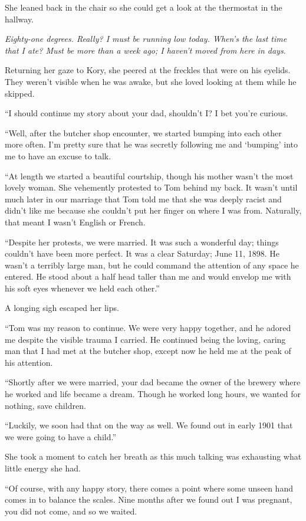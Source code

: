 She leaned back in the chair so she could get a look at the thermostat in the hallway.

\textit{Eighty-one degrees. Really? I must be running low today. When's the last time that I ate? Must be more than a week ago; I haven't moved from here in days.}

Returning her gaze to Kory, she peered at the freckles that were on his eyelids. They weren't visible when he was awake, but she loved looking at them while he skipped.

``I should continue my story about your dad, shouldn't I? I bet you're curious.

``Well, after the butcher shop encounter, we started bumping into each other more often. I'm pretty sure that he was secretly following me and `bumping' into me to have an excuse to talk.

``At length we started a beautiful courtship, though his mother wasn't the most lovely woman. She vehemently protested to Tom behind my back. It wasn't until much later in our marriage that Tom told me that she was deeply racist and didn't like me because she couldn't put her finger on where I was from. Naturally, that meant I wasn't English or French.

``Despite her protests, we were married. It was such a wonderful day; things couldn't have been more perfect. It was a clear Saturday; June 11, 1898. He wasn't a terribly large man, but he could command the attention of any space he entered. He stood about a half head taller than me and would envelop me with his soft eyes whenever we held each other.''

A longing sigh escaped her lips.

``Tom was my reason to continue. We were very happy together, and he adored me despite the visible trauma I carried. He continued being the loving, caring man that I had met at the butcher shop, except now he held me at the peak of his attention.

``Shortly after we were married, your dad became the owner of the brewery where he worked and life became a dream. Though he worked long hours, we wanted for nothing, save children.

``Luckily, we soon had that on the way as well. We found out in early 1901 that we were going to have a child.''

She took a moment to catch her breath as this much talking was exhausting what little energy she had.

``Of course, with any happy story, there comes a point where some unseen hand comes in to balance the scales. Nine months after we found out I was pregnant, you did not come, and so we waited.

